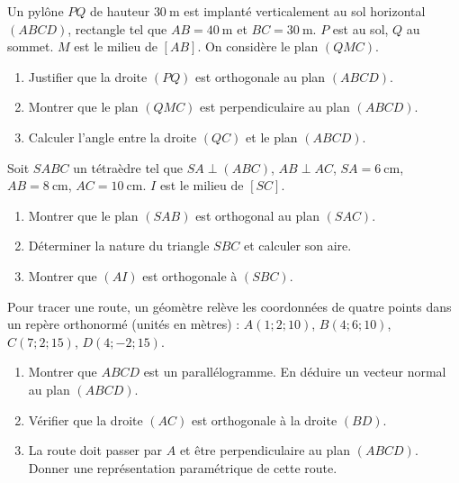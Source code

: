 \documentclass[11pt]{article}
\begin{document}
\begin{exercice}
Un pylône $PQ$ de hauteur $\SI{30}{\meter}$ est implanté verticalement au sol horizontal $(ABCD)$, rectangle tel que $AB = \SI{40}{\meter}$ et $BC = \SI{30}{\meter}$. $P$ est au sol, $Q$ au sommet. $M$ est le milieu de $[AB]$. On considère le plan $(QMC)$.
\begin{enumerate}
    \item Justifier que la droite $(PQ)$ est orthogonale au plan $(ABCD)$.
    \item Montrer que le plan $(QMC)$ est perpendiculaire au plan $(ABCD)$.
    \item Calculer l'angle entre la droite $(QC)$ et le plan $(ABCD)$.
\end{enumerate}
\end{exercice}

\begin{exercice}
Soit $SABC$ un tétraèdre tel que $SA \perp (ABC)$, $AB \perp AC$, $SA = \SI{6}{\centi\meter}$, $AB = \SI{8}{\centi\meter}$, $AC = \SI{10}{\centi\meter}$. $I$ est le milieu de $[SC]$.
\begin{enumerate}
    \item Montrer que le plan $(SAB)$ est orthogonal au plan $(SAC)$.
    \item Déterminer la nature du triangle $SBC$ et calculer son aire.
    \item Montrer que $(AI)$ est orthogonale à $(SBC)$.
\end{enumerate}
\end{exercice}

\begin{exercice}
Pour tracer une route, un géomètre relève les coordonnées de quatre points dans un repère orthonormé (unités en mètres) :
$A(1; 2; 10)$, $B(4; 6; 10)$, $C(7; 2; 15)$, $D(4; -2; 15)$.
\begin{enumerate}
    \item Montrer que $ABCD$ est un parallélogramme. En déduire un vecteur normal au plan $(ABCD)$.
    \item Vérifier que la droite $(AC)$ est orthogonale à la droite $(BD)$.
    \item La route doit passer par $A$ et être perpendiculaire au plan $(ABCD)$. Donner une représentation paramétrique de cette route.
\end{enumerate}
\end{exercice}
\end{document}
